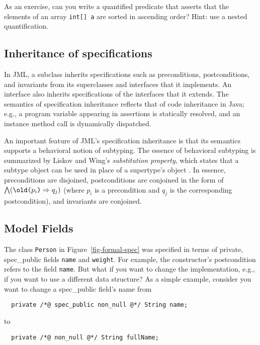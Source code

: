 \documentclass{jotarticle}
\begin{document}
As an exercise, can you write a quantified predicate that asserts that the
elements of an array \texttt{int[] a} are sorted in ascending order? 
Hint: use a nested quantification.
  
\subsection{Inheritance of specifications}

In JML, a subclass inherits specifications such as preconditions,
postconditions, and invariants from its superclasses and interfaces
that it implements.  An interface also inherits specifications of the
interfaces that it extends.
The semantics of specification inheritance
reflects that of code inheritance in Java; e.g., a program variable
appearing in assertions is statically resolved, and an instance method
call is dynamically dispatched.

An important feature of JML's specification inheritance is that its
semantics supports a behavioral notion of subtyping. The essence of
behavioral subtyping is summarized by Liskov and Wing's
\emph{substitution property}, which states that a subtype object can
be used in place of a supertype's object \cite{Liskov-Wing94}.  In
essence, preconditions are disjoined, postconditions are conjoined in
the form of $\bigwedge(\OLD{$p_i$} \Rightarrow q_j)$ (where $p_i$ is a
precondition and $q_j$ is the corresponding postcondition), and
invariants are conjoined.

\subsection{Model Fields}

The class \texttt{Person} in Figure~\ref{fig-formal-spec} was
specified in terms of private, spec\_public fields \texttt{name} and
\texttt{weight}. 
For example, the constructor's postcondition refers to the field
\texttt{name}. But what if you want to change the implementation,
e.g., if you want to use a different data structure?  As a simple
example, consider you want to change a spec\_public field's name from

\begin{verbatim}
  private /*@ spec_public non_null @*/ String name;
\end{verbatim}

to

\begin{verbatim}
  private /*@ non_null @*/ String fullName;
\end{verbatim}
\end{document}
